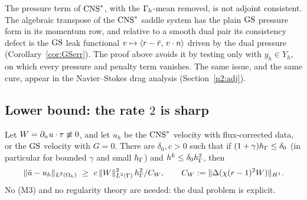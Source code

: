 \begin{remark}\label{l2:rem:adj}
The pressure term of $\mathrm{CNS}^\ast$, with the $\Gamma_h$-mean removed, is not adjoint consistent. The algebraic transpose of the $\mathrm{CNS}^\ast$ saddle system has the plain $\mathrm{GS}$ pressure form in its momentum row, and relative to a smooth dual pair its consistency defect is the $\mathrm{GS}$ leak functional $v\mapsto\langle r-\bar r,\, v\cdot n\rangle$ driven by the dual pressure (Corollary~\ref{cor:GSerr}). The proof above avoids it by testing only with $y_h\in Y_h$, on which every pressure and penalty term vanishes. The same issue, and the same cure, appear in the Navier--Stokes drag analysis (Section~\ref{n2:adj}).
\end{remark}

\subsection{Lower bound: the rate \texorpdfstring{$2$}{2} is sharp}

\begin{theorem}\label{l2:thm:L3}
Let $W=\partial_n u\cdot\tau\not\equiv0$, and let $u_h$ be the $\mathrm{CNS}^\ast$ velocity with flux-corrected data, or the $\mathrm{GS}$ velocity with $G=0$. There are $\delta_0,c>0$ such that if $(1+\gamma)h_\Gamma\le\delta_0$ (in particular for bounded $\gamma$ and small $h_\Gamma$) and $h^k\le\delta_0h_\Gamma^2$, then
\[
\lVert \tilde u-u_h\rVert_{L^2(\Omega_h)}\ \ge\ c\,\lVert W\rVert^2_{L^2(\Gamma)}\,h_\Gamma^2/C_W,\qquad C_W:=\lVert \Delta(\chi(r-1)^2W)\rVert_{H^1}.
\]
No (M3) and no regularity theory are needed: the dual problem is explicit.
\end{theorem}

